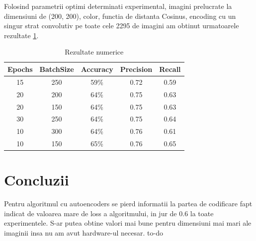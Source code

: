 \documentclass{article}
\begin{document}
Folosind parametrii optimi determinati experimental, imagini prelucrate la dimensiuni de (200, 200), color, functia de distanta Cosinus, encoding cu un singur strat convolutiv pe toate cele 2295 de imagini am obtinut urmatoarele rezultate \ref{tab:resNum}.
\begin{table}[h!]
  \begin{center}
    \caption{Rezultate numerice}
    \label{tab:resNum}
    \begin{tabular}{c|c|c|c|c}
      \textbf{Epochs} & \textbf{BatchSize} & \textbf{Accuracy} & \textbf{Precision} & \textbf{Recall} \\
      \hline
      15 & 250 & 59\% & 0.72 & 0.59 \\
      20 & 200 & 64\% & 0.75 & 0.63 \\
      20 & 150 & 64\% & 0.75 & 0.63 \\
      30 & 250 & 64\% & 0.75 & 0.64 \\
      10 & 300 & 64\% & 0.76 & 0.61 \\
      10 & 150 & 65\% & 0.76 & 0.65 \\
      \end{tabular}
  \end{center}
\end{table}


\section{Concluzii}

Pentru algoritmul cu autoencoders se pierd informatii la partea de codificare fapt indicat de valoarea mare de loss a algoritmului, in jur de 0.6 la toate experimentele. S-ar putea obtine valori mai bune pentru dimensiuni mai mari ale imaginii insa nu am avut hardware-ul necesar.
to-do

\newpage
 

\end{document}
